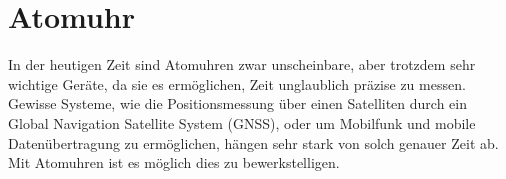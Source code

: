 \chapter{Atomuhr\label{chapter:atomuhr}}
\begin{refsection}

%

In der heutigen Zeit sind Atomuhren zwar unscheinbare, aber trotzdem sehr wichtige Geräte, da sie es ermöglichen, Zeit unglaublich präzise zu messen. 
Gewisse Systeme, wie die Positionsmessung über einen Satelliten durch ein Global Navigation Satellite System (GNSS), oder um Mobilfunk und mobile Datenübertragung zu ermöglichen, hängen sehr stark von solch genauer Zeit ab.
Mit Atomuhren ist es möglich dies zu bewerkstelligen. %

	









\printbibliography[heading=subbibliography]
\end{refsection}

